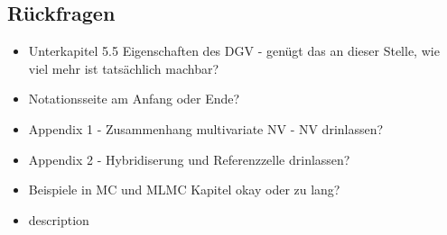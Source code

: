 \subsection{Rückfragen}
\begin{itemize}
	\item Unterkapitel 5.5 Eigenschaften des DGV - genügt das an dieser Stelle, wie viel mehr ist tatsächlich machbar?
	\item Notationsseite am Anfang oder Ende?
	\item Appendix 1 - Zusammenhang multivariate NV - NV drinlassen?
	\item Appendix 2 - Hybridiserung und Referenzzelle drinlassen?
	\item Beispiele in MC und MLMC Kapitel okay oder zu lang?
	\item description
\end{itemize}